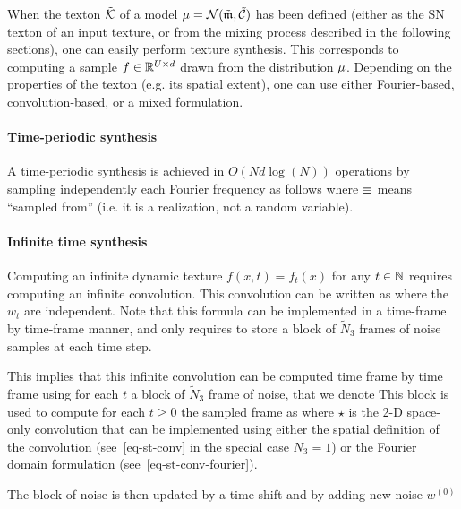 When the texton $\tilde{\mathcal{K}}$ of a model $\mu=\mathcal{N}(\tilde{{\frak m}},\tilde{\mathcal{C}})$ has been defined (either as the SN texton of an input texture, or from the mixing process described in the following sections), one can easily perform texture synthesis. This corresponds to computing a sample $f \in \mathbb{R}^{U \times d}$ drawn from the distribution $\mu$. Depending on the properties of the texton (e.g. its spatial extent), one can use either Fourier-based, convolution-based, or a mixed formulation.

\paragraph{Time-periodic synthesis}

A time-periodic synthesis is achieved in $O(Nd\log(N))$ operations by sampling independently each Fourier frequency as follows
where $\equiv$ means ``sampled from'' (i.e. it is a realization, not a random variable).

\paragraph{Infinite time synthesis}

Computing an infinite dynamic texture $f(x,t)=f_t(x)$ for any $t \in \mathbb{N}$ requires computing an infinite convolution. 
This convolution can be written as
where the $w_t$ are independent.
Note that this formula can be implemented in a time-frame by time-frame manner, and only requires to store a block of $\tilde N_3$ frames of noise samples at each time step.

 This implies that this infinite convolution can be computed time frame by time frame using for each $t$ a block of $\tilde N_3$ frame of noise, that we denote
This block is used to compute for each $t \geq 0$ the sampled frame as
where $\star$ is the 2-D space-only convolution that can be implemented using either the spatial definition of the convolution (see~\eqref{eq-st-conv} in the special case $N_3=1$) or
the Fourier domain formulation (see~\eqref{eq-st-conv-fourier}).

The block of noise is then updated by a time-shift and by adding new noise $w^{(0)}$
\fi


